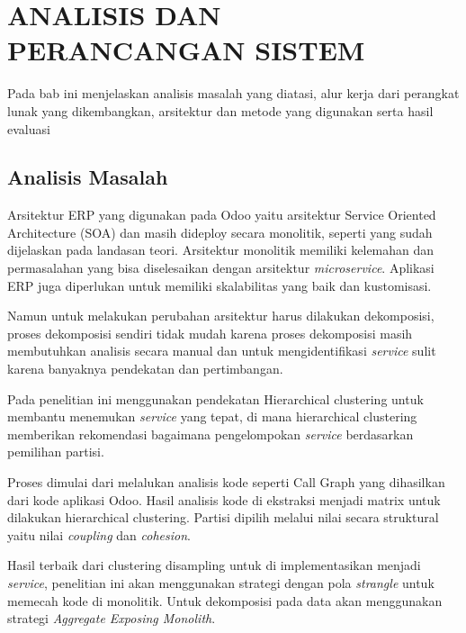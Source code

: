 \chapter{ANALISIS DAN PERANCANGAN SISTEM}
\vspace{4.5pt}

Pada bab ini menjelaskan analisis masalah yang diatasi, alur kerja dari perangkat lunak yang dikembangkan, arsitektur dan metode yang digunakan serta hasil evaluasi

\section{Analisis Masalah}
Arsitektur ERP yang digunakan pada Odoo yaitu arsitektur Service Oriented Architecture (SOA) dan masih dideploy secara monolitik, seperti yang sudah dijelaskan pada landasan teori. Arsitektur monolitik memiliki kelemahan dan permasalahan yang bisa diselesaikan dengan arsitektur \textit{microservice}. Aplikasi ERP juga diperlukan untuk memiliki skalabilitas yang baik dan kustomisasi.

Namun untuk melakukan perubahan arsitektur harus dilakukan dekomposisi, proses dekomposisi sendiri tidak mudah karena proses dekomposisi masih membutuhkan analisis secara manual dan untuk mengidentifikasi \textit{service} sulit karena banyaknya pendekatan dan pertimbangan.

Pada penelitian ini menggunakan pendekatan Hierarchical clustering untuk membantu menemukan \textit{service} yang tepat, di mana hierarchical clustering memberikan rekomendasi bagaimana pengelompokan \textit{service} berdasarkan pemilihan partisi.

Proses dimulai dari melalukan analisis kode seperti Call Graph yang dihasilkan dari kode aplikasi Odoo. Hasil analisis kode di ekstraksi menjadi matrix untuk dilakukan hierarchical clustering. Partisi  dipilih melalui nilai secara struktural yaitu nilai \textit{coupling}  dan \textit{cohesion}.

Hasil terbaik dari clustering disampling untuk di implementasikan menjadi \textit{service}, penelitian ini akan menggunakan strategi dengan pola \textit{strangle} untuk memecah kode di monolitik. Untuk dekomposisi pada data akan menggunakan strategi \textit{Aggregate Exposing Monolith}.




